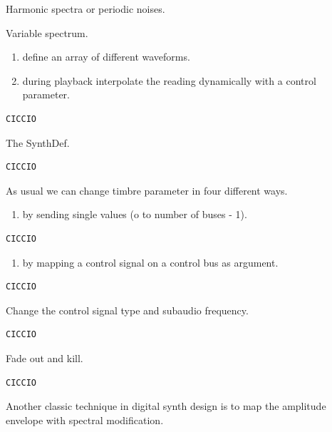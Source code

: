 Harmonic spectra or periodic noises.

Variable spectrum.

\begin{enumerate}
\def\labelenumi{\arabic{enumi}.}
\tightlist
\item define an array of different waveforms.
\item during playback interpolate the reading dynamically with a control parameter.
\end{enumerate}

\begin{lstlisting}[frame=single] 
CICCIO
\end{lstlisting}

The SynthDef.

\begin{lstlisting}[frame=single] 
CICCIO
\end{lstlisting}

As usual we can change timbre parameter in four different ways.

\begin{enumerate}
\def\labelenumi{\arabic{enumi}.}
\tightlist
\item by sending single values (o to number of buses - 1).
\end{enumerate}

\begin{lstlisting}[frame=single] 
CICCIO
\end{lstlisting}

\begin{enumerate}
\def\labelenumi{\arabic{enumi}.}
\setcounter{enumi}{1}
\tightlist
\item by mapping a control signal on a control bus as argument.
\end{enumerate}

\begin{lstlisting}[frame=single] 
CICCIO
\end{lstlisting}

Change the control signal type and subaudio frequency.

\begin{lstlisting}[frame=single] 
CICCIO
\end{lstlisting}

Fade out and kill.

\begin{lstlisting}[frame=single] 
CICCIO
\end{lstlisting}

Another classic technique in digital synth design is to map the amplitude envelope with spectral modification.

